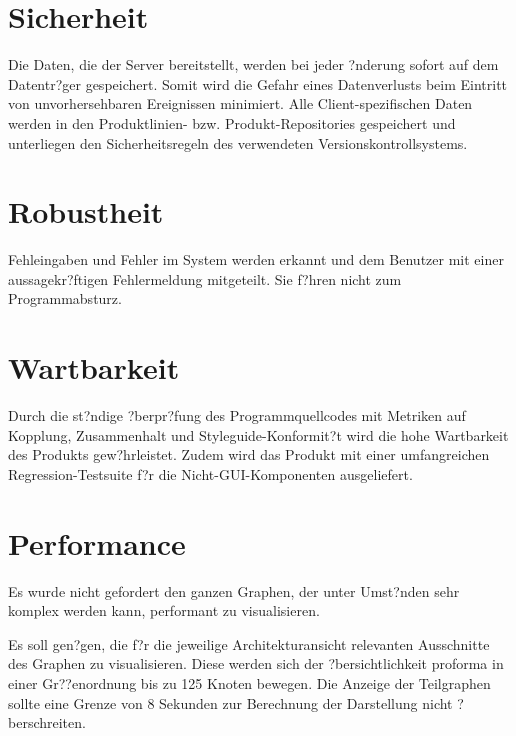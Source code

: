 \section{Sicherheit}
Die Daten, die der Server bereitstellt, werden bei jeder ?nderung sofort auf dem Datentr?ger gespeichert.
Somit wird die Gefahr eines Datenverlusts beim Eintritt von unvorhersehbaren Ereignissen minimiert.
Alle Client-spezifischen Daten werden in den Produktlinien- bzw.
Produkt-Repositories gespeichert und unterliegen  den Sicherheitsregeln des verwendeten
Versionskontrollsystems.

\section{Robustheit}
Fehleingaben und Fehler im System werden erkannt und dem Benutzer mit einer aussagekr?ftigen 
Fehlermeldung mitgeteilt.
Sie f?hren nicht zum Programmabsturz.

\section{Wartbarkeit}
Durch die st?ndige ?berpr?fung des Programmquellcodes mit Metriken auf Kopplung, Zusammenhalt und
Styleguide-Konformit?t wird die hohe Wartbarkeit des 
Produkts gew?hrleistet. Zudem wird das Produkt mit einer umfangreichen
Regression-Testsuite f?r die Nicht-GUI-Komponenten ausgeliefert.

\section{Performance}
Es wurde nicht gefordert den ganzen Graphen, der unter Umst?nden sehr komplex
werden kann, performant zu visualisieren.\par
Es soll gen?gen, die f?r die jeweilige Architekturansicht relevanten
Ausschnitte des Graphen zu visualisieren.
Diese werden sich der ?bersichtlichkeit proforma in einer 
Gr??enordnung bis zu 125 Knoten bewegen. Die Anzeige der Teilgraphen sollte 
eine Grenze von 8 Sekunden zur Berechnung der Darstellung nicht ?berschreiten.

